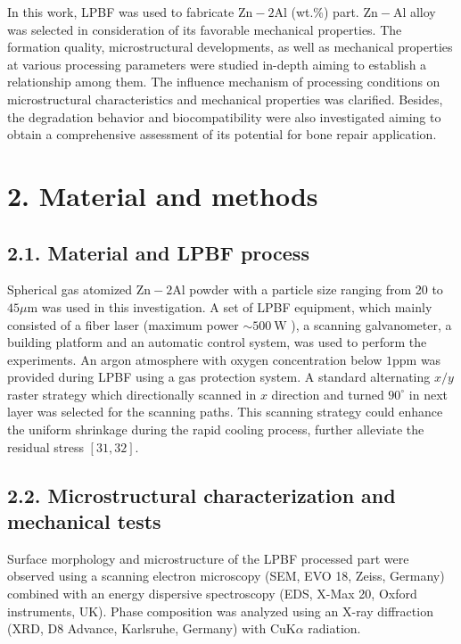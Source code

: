 \documentclass[10pt]{article}
\begin{document}
In this work, LPBF was used to fabricate $\mathrm{Zn}-2 \mathrm{Al}$ (wt.\%) part. $\mathrm{Zn}-\mathrm{Al}$ alloy was selected in consideration of its favorable mechanical properties. The formation quality, microstructural developments, as well as mechanical properties at various processing parameters were studied in-depth aiming to establish a relationship among them. The influence mechanism of processing conditions on microstructural characteristics and mechanical properties was clarified. Besides, the degradation behavior and biocompatibility were also investigated aiming to obtain a comprehensive assessment of its potential for bone repair application.

\section*{2. Material and methods}
\subsection*{2.1. Material and LPBF process}
Spherical gas atomized $\mathrm{Zn}-2 \mathrm{Al}$ powder with a particle size ranging from 20 to $45 \mu \mathrm{m}$ was used in this investigation. A set of LPBF equipment, which mainly consisted of a fiber laser (maximum power $\sim 500 \mathrm{~W}$ ), a scanning galvanometer, a building platform and an automatic control system, was used to perform the experiments. An argon atmosphere with oxygen concentration below $1 \mathrm{ppm}$ was provided during LPBF using a gas protection system. A standard alternating $x / y$ raster strategy which directionally scanned in $x$ direction and turned $90^{\circ}$ in next layer was selected for the scanning paths. This scanning strategy could enhance the uniform shrinkage during the rapid cooling process, further alleviate the residual stress $[31,32]$.

\subsection*{2.2. Microstructural characterization and mechanical tests}
Surface morphology and microstructure of the LPBF processed part were observed using a scanning electron microscopy (SEM, EVO 18, Zeiss, Germany) combined with an energy dispersive spectroscopy (EDS, X-Max 20, Oxford instruments, UK). Phase composition was analyzed using an X-ray diffraction (XRD, D8 Advance, Karlsruhe, Germany) with $\mathrm{Cu} \mathrm{K} \alpha$ radiation.
\end{document}
